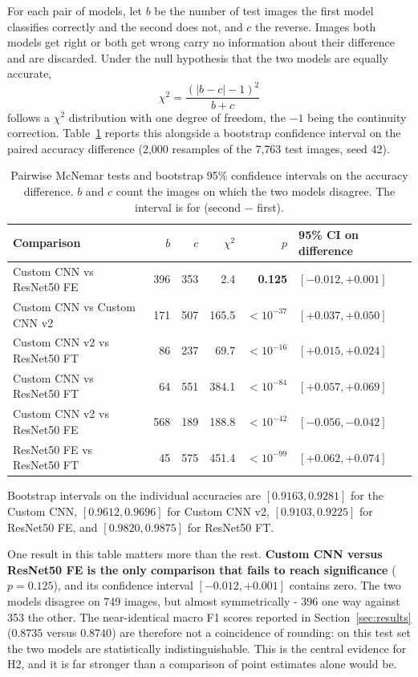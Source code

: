 \documentclass[12pt,a4paper]{article}
\begin{document}
For each pair of models, let $b$ be the number of test images the first model classifies correctly and the second does not, and $c$ the reverse. Images both models get right or both get wrong carry no information about their difference and are discarded. Under the null hypothesis that the two models are equally accurate,
\begin{equation}
    \chi^2 = \frac{(|b - c| - 1)^2}{b + c}
    \label{eq:mcnemar}
\end{equation}
follows a $\chi^2$ distribution with one degree of freedom, the $-1$ being the continuity correction. Table~\ref{tab:mcnemar} reports this alongside a bootstrap confidence interval on the paired accuracy difference (2{,}000 resamples of the 7{,}763 test images, seed 42).

\begin{table}[H]
    \centering
    \caption{Pairwise McNemar tests and bootstrap 95\% confidence intervals on the accuracy difference. $b$ and $c$ count the images on which the two models disagree. The interval is for (second $-$ first).}
    \label{tab:mcnemar}
    \begin{tabular}{lrrrrl}
        \toprule
        Comparison & $b$ & $c$ & $\chi^2$ & $p$ & 95\% CI on difference \\
        \midrule
        Custom CNN vs ResNet50 FE & 396 & 353 & 2.4 & \textbf{0.125} & $[-0.012, +0.001]$ \\
        Custom CNN vs Custom CNN v2 & 171 & 507 & 165.5 & $<10^{-37}$ & $[+0.037, +0.050]$ \\
        Custom CNN v2 vs ResNet50 FT & 86 & 237 & 69.7 & $<10^{-16}$ & $[+0.015, +0.024]$ \\
        Custom CNN vs ResNet50 FT & 64 & 551 & 384.1 & $<10^{-84}$ & $[+0.057, +0.069]$ \\
        Custom CNN v2 vs ResNet50 FE & 568 & 189 & 188.8 & $<10^{-42}$ & $[-0.056, -0.042]$ \\
        ResNet50 FE vs ResNet50 FT & 45 & 575 & 451.4 & $<10^{-99}$ & $[+0.062, +0.074]$ \\
        \bottomrule
    \end{tabular}
\end{table}

Bootstrap intervals on the individual accuracies are $[0.9163, 0.9281]$ for the Custom CNN, $[0.9612, 0.9696]$ for Custom CNN v2, $[0.9103, 0.9225]$ for ResNet50 FE, and $[0.9820, 0.9875]$ for ResNet50 FT.

One result in this table matters more than the rest. \textbf{Custom CNN versus ResNet50 FE is the only comparison that fails to reach significance} ($p = 0.125$), and its confidence interval $[-0.012, +0.001]$ contains zero. The two models disagree on 749 images, but almost symmetrically - 396 one way against 353 the other. The near-identical macro F1 scores reported in Section~\ref{sec:results} ($0.8735$ versus $0.8740$) are therefore not a coincidence of rounding: on this test set the two models are statistically indistinguishable. This is the central evidence for H2, and it is far stronger than a comparison of point estimates alone would be.
\end{document}
